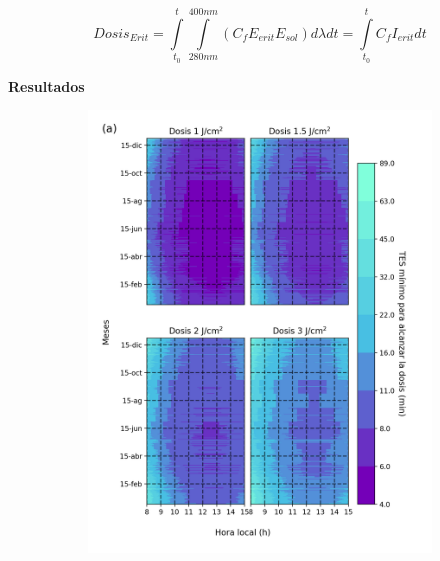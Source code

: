 \documentclass{article}
\begin{document}
\begin{multicols}{2}
\begin{equation*}
    Dosis_{Erit}=\int\limits_{t_0}^{t} \int\limits_{280nm}^{400nm} \left( C_f E_{erit}E_{sol}\right)d\lambda dt = \int\limits_{t_0}^{t}C_f I_{erit}dt
\end{equation*}
\begin{center}
\begin{shaded}
\textbf{\textcolor{na}{Resultados}}
\end{shaded}
\end{center}
\vspace{-0.2cm}
\begin{figure}[H]
    \begin{subfigure}[H]{0.5\linewidth}
        \changefontsizes{9pt}
        \centering
        \vspace{-0.1cm}
        \includegraphics[scale=0.38]{images/pso.png}
    \end{subfigure}
    \begin{subfigure}[H]{0.4\linewidth}
        \changefontsizes{9pt}
        \centering
        \vspace{-0.2cm}

\end{subfigure}
\end{figure}
\end{multicols}
\end{document}
